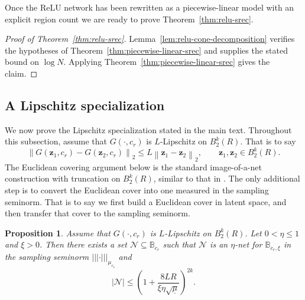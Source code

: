 \documentclass{article}
\theoremstyle{plain}
\newtheorem{proposition}[theorem]{Proposition}
\theoremstyle{definition}
\theoremstyle{remark}
\newcommand*{\snorm}[2]{\left\vert\!\left\vert\!\left\vert #1 \right\vert\!\right\vert\!\right\vert_{#2}}
\begin{document}
Once the ReLU network has been rewritten as a piecewise-linear model with an explicit region count we are ready to prove Theorem~\ref{thm:relu-srec}.

\begin{proof}[Proof of Theorem~\ref{thm:relu-srec}]
  Lemma~\ref{lem:relu-cone-decomposition} verifies the hypotheses of Theorem~\ref{thm:piecewise-linear-srec} and supplies the stated bound on $\log N$. Applying Theorem~\ref{thm:piecewise-linear-srec} gives the claim.
\end{proof}

\subsection{A Lipschitz specialization}\label{app:lipschitz-specialization}

We now prove the Lipschitz specialization stated in the main text. Throughout this subsection, assume that $G\left(\cdot,c_r\right)$ is $L$-Lipschitz on $B_2^k\left(R\right)$. That is to say 
  \[
    \left\|
    G\left(\mathbf z_1,c_r\right)
    -
    G\left(\mathbf z_2,c_r\right)
    \right\|_2
    \leq
    L\left\|\mathbf z_1-\mathbf z_2\right\|_2,
    \qquad
    \mathbf z_1,\mathbf z_2\in B_2^k(R).
  \] 
The Euclidean covering argument below is the standard image-of-a-net construction with truncation on $B_2^k\left(R\right)$, similar to that in \cite[Lemma 4.1 and its proof]{bora2017compressed}. The only additional step is to convert the Euclidean cover into one measured in the sampling seminorm. That is to say we first build a Euclidean cover in latent space, and then transfer that cover to the sampling seminorm.

\begin{proposition}
  \label{prop:lipschitz-cover-transfer}
  Assume that $G(\cdot,c_r)$ is $L$-Lipschitz on $B_2^k(R)$. Let $0<\eta\leq 1$ and $\xi>0$. Then
  there exists a set $\mathcal N\subseteq\mathbb B_{c_r}$ such that
  $\mathcal N$ is an $\eta$-net for $\mathbb B_{c_r,\xi}$ in the sampling
  seminorm $\snorm{\cdot}{\mu_{c_s}}$ and
  \[
    |\mathcal N|
    \leq
    \left(
      1+
      \frac{8LR}
      {\xi\eta\sqrt{\underline{\mu}}}
    \right)^{2k}.
  \]
\end{proposition}
\end{document}
